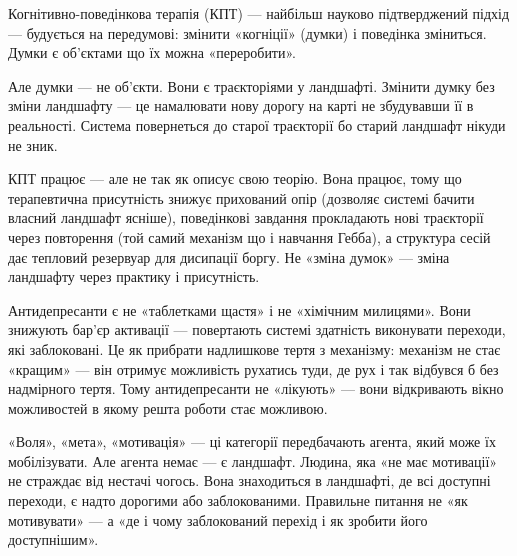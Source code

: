 \documentclass[12pt, a4paper, openany]{book}
\begin{document}
Когнітивно-поведінкова терапія (КПТ) --- найбільш науково підтверджений підхід --- будується на передумові: змінити «когніції» (думки) і поведінка зміниться. Думки є об'єктами що їх можна «переробити».

Але думки — не об'єкти. Вони є траєкторіями у ландшафті. Змінити думку без зміни ландшафту --- це намалювати нову дорогу на карті не збудувавши її в реальності. Система повернеться до старої траєкторії бо старий ландшафт нікуди не зник.

КПТ працює --- але не так як описує свою теорію. Вона працює, тому що терапевтична присутність знижує прихований опір (дозволяє системі бачити власний ландшафт ясніше), поведінкові завдання прокладають нові траєкторії через повторення (той самий механізм що і навчання Гебба), а структура сесій дає тепловий резервуар для дисипації боргу. Не «зміна думок» --- зміна ландшафту через практику і присутність.

Антидепресанти є не «таблетками щастя» і не «хімічним милицями». Вони знижують бар'єр активації --- повертають системі здатність виконувати переходи, які заблоковані. Це як прибрати надлишкове тертя з механізму: механізм не стає «кращим» --- він отримує можливість рухатись туди, де рух і так відбувся б без надмірного тертя. Тому антидепресанти не «лікують» --- вони відкривають вікно можливостей в якому решта роботи стає можливою.

«Воля», «мета», «мотивація» --- ці категорії передбачають агента, який може їх мобілізувати. Але агента немає --- є ландшафт. Людина, яка «не має мотивації» не страждає від нестачі чогось. Вона знаходиться в ландшафті, де всі доступні переходи, є надто дорогими або заблокованими. Правильне питання не «як мотивувати» --- а «де і чому заблокований перехід і як зробити його доступнішим».
\end{document}
